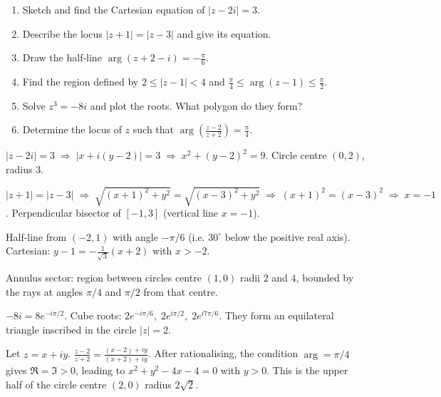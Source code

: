 \documentclass[11pt]{article}
\begin{document}
\begin{exercice}
\begin{enumerate}
\item Sketch and find the Cartesian equation of $|z-2i|=3$.
\item Describe the locus $|z+1|=|z-3|$ and give its equation.
\item Draw the half‑line $\arg(z+2- i) = -\frac{\pi}{6}$.
\item Find the region defined by $2 \le |z-1| < 4$ and $\frac{\pi}{4} \le \arg(z-1) \le \frac{\pi}{2}$.
\item Solve $z^3 = -8i$ and plot the roots.  What polygon do they form?
\item Determine the locus of $z$ such that $\arg\!\left(\frac{z-2}{z+2}\right) = \frac{\pi}{4}$.
\end{enumerate}
\end{exercice}

\begin{corrige}[Exercise 1]
$|z-2i|=3 \;\Rightarrow\; |x+i(y-2)|=3 \;\Rightarrow\; x^2+(y-2)^2=9$.  Circle centre $(0,2)$, radius $3$.
\end{corrige}

\begin{corrige}[Exercise 2]
$|z+1|=|z-3| \;\Rightarrow\; \sqrt{(x+1)^2+y^2} = \sqrt{(x-3)^2+y^2} \;\Rightarrow\; (x+1)^2 = (x-3)^2 \;\Rightarrow\; x=-1$.  Perpendicular bisector of $[-1,3]$ (vertical line $x=-1$).
\end{corrige}

\begin{corrige}[Exercise 3]
Half‑line from $(-2,1)$ with angle $-\pi/6$ (i.e. $30^\circ$ below the positive real axis).  Cartesian: $y-1 = -\frac{1}{\sqrt{3}}(x+2)$ with $x>-2$.
\end{corrige}

\begin{corrige}[Exercise 4]
Annulus sector: region between circles centre $(1,0)$ radii $2$ and $4$, bounded by the rays at angles $\pi/4$ and $\pi/2$ from that centre.
\end{corrige}

\begin{corrige}[Exercise 5]
$-8i = 8e^{-i\pi/2}$.  Cube roots: $2e^{-i\pi/6},\; 2e^{i\pi/2},\; 2e^{i7\pi/6}$.  They form an equilateral triangle inscribed in the circle $|z|=2$.
\end{corrige}

\begin{corrige}[Exercise 6]
Let $z=x+iy$.  $\frac{z-2}{z+2} = \frac{(x-2)+iy}{(x+2)+iy}$.  After rationalising, the condition $\arg = \pi/4$ gives $\Re = \Im >0$, leading to $x^2+y^2-4x-4=0$ with $y>0$.  This is the upper half of the circle centre $(2,0)$ radius $2\sqrt{2}$.
\end{corrige}
\end{document}
